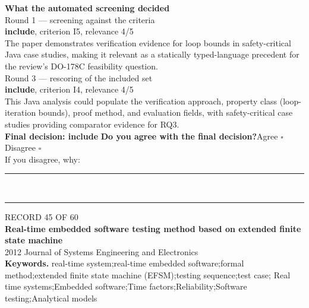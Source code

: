 \documentclass[11pt,a4paper]{article}
\begin{document}
\vspace{3mm}
\vspace{2.5mm}
{\small\textbf{What the automated screening decided}}\\[2mm]
{\footnotesize\color{soft}Round 1 --- screening against the criteria}\\[0.5mm]
{\small\textbf{include}, criterion I5, relevance 4/5}\\[0.5mm]
{\small The paper demonstrates verification evidence for loop bounds in safety-critical Java case studies, making it relevant as a statically typed-language precedent for the review's DO-178C feasibility question.}\\[2.5mm]
{\footnotesize\color{soft}Round 3 --- rescoring of the included set}\\[0.5mm]
{\small\textbf{include}, criterion I4, relevance 4/5}\\[0.5mm]
{\small This Java analysis could populate the verification approach, property class (loop-iteration bounds), proof method, and evaluation fields, with safety-critical case studies providing comparator evidence for RQ3.}\\[2.5mm]
{\small\textbf{Final decision: include}}
\vspace{2mm}
{\small\textbf{Do you agree with the final decision?}\quad{}Agree $\square$\qquad{}Disagree $\square$}\\[1mm]
{\footnotesize\color{soft}If you disagree, why:}\\[1mm]
\color{rule}\rule{\linewidth}{0.3pt}\\[3mm]\rule{\linewidth}{0.3pt}\color{black}
\clearpage
{\color{soft}\footnotesize RECORD 45 OF 60}\\[1mm]
{\large\bfseries Real-time embedded software testing method based on extended finite state machine}\\[1.5mm]
{\color{soft}\small 2012 \textperiodcentered{} Journal of Systems Engineering and Electronics}\\[2mm]
{\small\textbf{Keywords.} real-time system;real-time embedded software;formal method;extended finite state machine (EFSM);testing sequence;test case; Real time systems;Embedded software;Time factors;Reliability;Software testing;Analytical models}\\[2mm]
\end{document}
